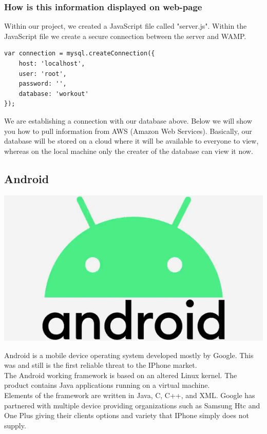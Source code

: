 \documentclass[a4paper,12pt]{report}
\begin{document}
\subsubsection{How is this information displayed on web-page}
Within our project, we created a JavaScript file called "server.js". Within the JavaScript file we create a secure connection between the server and WAMP.
\begin{verbatim}
var connection = mysql.createConnection({
    host: 'localhost',
    user: 'root',
    password: '',
    database: 'workout'
});
\end{verbatim}
We are establishing a connection with our database above. Below we will show you how to pull information from AWS (Amazon Web Services). Basically, our database will be stored on a cloud where it will be available to everyone to view, whereas on the local machine only the creater of the database can view it now.

\subsection{Android}
\includegraphics[scale=.1]{images/android.png}

Android is a mobile device operating system developed mostly by Google. This was and still is the first reliable threat to the IPhone market.
\\
The Android working framework is based on an altered Linux kernel. The product contains Java applications running on a virtual machine. \\

Elements of the framework are written in Java, C, C++, and XML.
Google has partnered with multiple device providing organizations such as Samsung Htc and One Plus giving their clients options and variety that IPhone simply does not supply.\cite{butler2010android}\\
\end{document}
